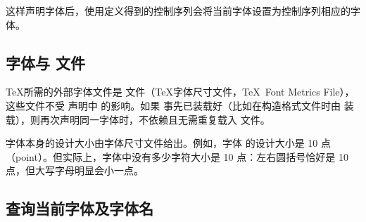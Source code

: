 \documentclass{book}
\begin{document}
这样声明字体后，使用定义得到的控制序列会将当前字体设置为控制序列相应的字体。

\subsection{字体与  文件}

\TeX 所需的外部字体文件是  文件（\TeX 字体尺寸文件，\TeX\ Font Metrics File），这些文件不受  声明中  的影响。如果  事先已装载好（比如在构造格式文件时由 \IniTeX 装载），则再次声明同一字体时，不依赖且无需重复载入  文件。

字体本身的设计大小由字体尺寸文件给出。例如，字体  的设计大小是 10 点（point）。但实际上，字体中没有多少字符大小是 10 点：左右圆括号恰好是 10 点，但大写字母明显会小一点。

\subsection{查询当前字体及字体名}
\end{document}

